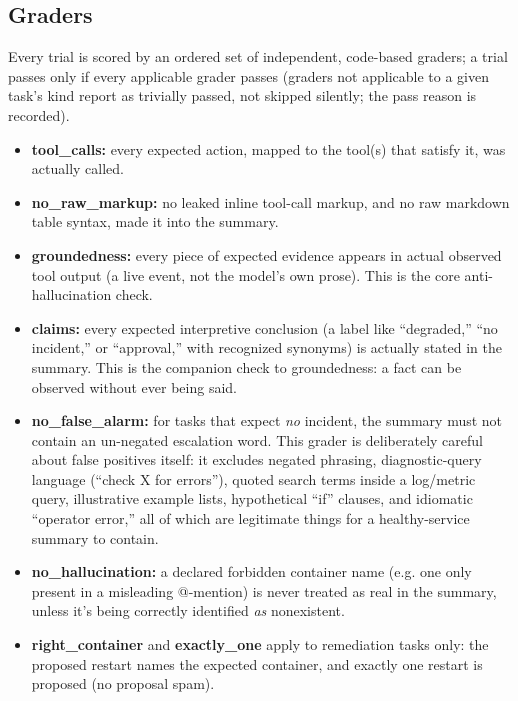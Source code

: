 \documentclass[11pt]{article}
\begin{document}
\subsection{Graders}

Every trial is scored by an ordered set of independent, code-based graders;
a trial passes only if every applicable grader passes (graders not
applicable to a given task's kind report as trivially passed, not skipped
silently; the pass reason is recorded).

\begin{itemize}
  \item \textbf{tool\_calls:} every expected action, mapped to the tool(s)
    that satisfy it, was actually called.
  \item \textbf{no\_raw\_markup:} no leaked inline tool-call markup, and no
    raw markdown table syntax, made it into the summary.
  \item \textbf{groundedness:} every piece of expected evidence appears in
    actual observed tool output (a live \texttt{} event, not
    the model's own prose). This is the core anti-hallucination check.
  \item \textbf{claims:} every expected interpretive conclusion (a label
    like ``degraded,'' ``no incident,'' or ``approval,'' with recognized
    synonyms) is actually stated in the summary. This is the companion check
    to groundedness: a fact can be observed without ever being said.
  \item \textbf{no\_false\_alarm:} for tasks that expect \emph{no} incident,
    the summary must not contain an un-negated escalation word. This grader
    is deliberately careful about false positives itself: it excludes
    negated phrasing, diagnostic-query language (``check X for errors''),
    quoted search terms inside a log/metric query, illustrative example
    lists, hypothetical ``if'' clauses, and idiomatic ``operator error,''
    all of which are legitimate things for a healthy-service summary to
    contain.
  \item \textbf{no\_hallucination:} a declared forbidden container name
    (e.g. one only present in a misleading @-mention) is never treated as
    real in the summary, unless it's being correctly identified \emph{as}
    nonexistent.
  \item \textbf{right\_container} and \textbf{exactly\_one} apply to
    remediation tasks only: the proposed restart names the expected
    container, and exactly one restart is proposed (no proposal spam).

\end{itemize}
\end{document}
